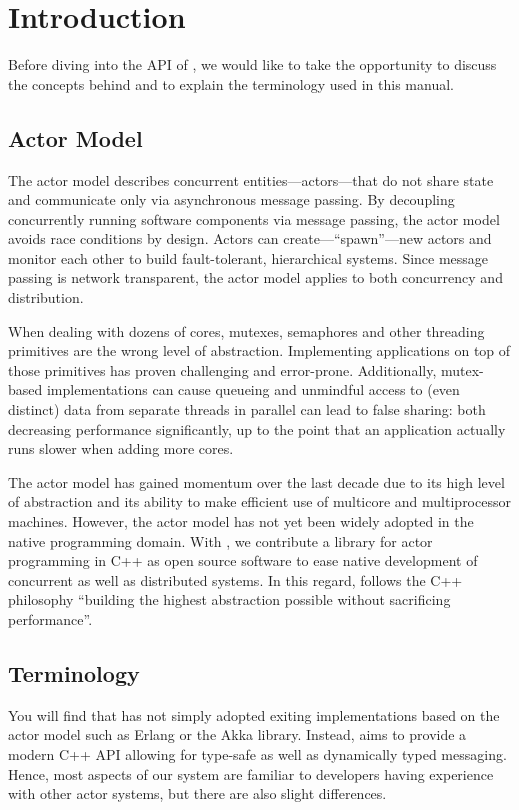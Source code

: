 \section{Introduction}

Before diving into the API of \lib, we would like to take the opportunity to discuss the concepts behind \lib and to explain the terminology used in this manual.

\subsection{Actor Model}

The actor model describes concurrent entities---actors---that do not share state and communicate only via asynchronous message passing.
By decoupling concurrently running software components via message passing, the actor model avoids race conditions by design.
Actors can create---``spawn''---new actors and monitor each other to build fault-tolerant, hierarchical systems.
Since message passing is network transparent, the actor model applies to both concurrency and distribution.

When dealing with dozens of cores, mutexes, semaphores and other threading primitives are the wrong level of abstraction.
Implementing applications on top of those primitives has proven challenging and error-prone.
Additionally, mutex-based implementations can cause queueing and unmindful access to (even distinct) data from separate threads in parallel can lead to false sharing: both decreasing performance significantly, up to the point that an application actually runs slower when adding more cores.

The actor model has gained momentum over the last decade due to its high level of abstraction and its ability to make efficient use of multicore and multiprocessor machines.
However, the actor model has not yet been widely adopted in the native programming domain.
With \lib, we contribute a library for actor programming in C++ as open source software to ease native development of concurrent as well as distributed systems.
In this regard, \lib follows the C++ philosophy ``building the highest abstraction possible without sacrificing performance''.

\subsection{Terminology}

You will find that \lib has not simply adopted exiting implementations based on the actor model such as Erlang or the Akka library.
Instead, \lib aims to provide a modern C++ API allowing for type-safe as well as dynamically typed messaging.
Hence, most aspects of our system are familiar to developers having experience with other actor systems, but there are also slight differences.


